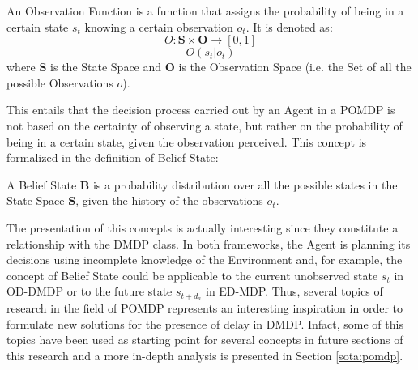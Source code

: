                 \begin{definition}
                    \label{def:pomdp-obsf}
                    An Observation Function is a function that assigns the probability of being in a certain state $s_t$ knowing a certain observation $o_t$. It is denoted as:
                    \[ O : \mathbf{S} \times \mathbf{O} \rightarrow [0, 1] \]
                    \[ O(s_t | o_t) \]
                    where $\mathbf{S}$ is the State Space and $\mathbf{O}$ is the Observation Space (i.e. the Set of all the possible Observations $o$). 
                \end{definition}
                
                This entails that the decision process carried out by an Agent in a POMDP is not based on the certainty of observing a state, but rather on the probability of being in a certain state, given the observation perceived. This concept is formalized in the definition of Belief State:
                
                \begin{definition}
                    \label{def:pomdp-belief}
                    A Belief State $\mathbf{B}$ is a probability distribution over all the possible states in the State Space $\mathbf{S}$, given the history of the observations $o_t$.
                \end{definition}
                
                The presentation of this concepts is actually interesting since they constitute a relationship with the DMDP class. In both frameworks, the Agent is planning its decisions using incomplete knowledge of the Environment and, for example, the concept of Belief State could be applicable to the current unobserved state $s_t$ in OD-DMDP or to the future state $s_{t+d_{a}}$ in ED-MDP. \newline
                Thus, several topics of research in the field of POMDP represents an interesting inspiration in order to formulate new solutions for the presence of delay in DMDP. Infact, some of this topics have been used as starting point for several concepts in future sections of this research and a more in-depth analysis is presented in Section \ref{sota:pomdp}.
            

